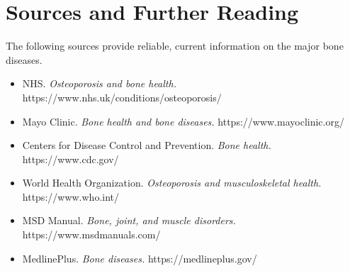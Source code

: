 \section*{Sources and Further Reading}
The following sources provide reliable, current information on the major bone diseases.
\begin{itemize}
    \item NHS. \textit{Osteoporosis and bone health.} https://www.nhs.uk/conditions/osteoporosis/
    \item Mayo Clinic. \textit{Bone health and bone diseases.} https://www.mayoclinic.org/
    \item Centers for Disease Control and Prevention. \textit{Bone health.} https://www.cdc.gov/
    \item World Health Organization. \textit{Osteoporosis and musculoskeletal health.} https://www.who.int/
    \item MSD Manual. \textit{Bone, joint, and muscle disorders.} https://www.msdmanuals.com/
    \item MedlinePlus. \textit{Bone diseases.} https://medlineplus.gov/
\end{itemize}

